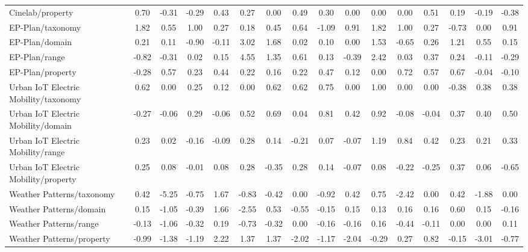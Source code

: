 \begin{tabular}{lccccccccccccccc}
Cinelab/property & 0.70 & -0.31 & -0.29 & 0.43 & 0.27 & 0.00 & 0.49 & 0.30 & 0.00 & 0.00 & 0.00 & 0.51 & 0.19 & -0.19 & -0.38 \\
EP-Plan/taxonomy & 1.82 & 0.55 & 1.00 & 0.27 & 0.18 & 0.45 & 0.64 & -1.09 & 0.91 & 1.82 & 1.00 & 0.27 & -0.73 & 0.00 & 0.91 \\
EP-Plan/domain & 0.21 & 0.11 & -0.90 & -0.11 & 3.02 & 1.68 & 0.02 & 0.10 & 0.00 & 1.53 & -0.65 & 0.26 & 1.21 & 0.55 & 0.15 \\
EP-Plan/range & -0.82 & -0.31 & 0.02 & 0.15 & 4.55 & 1.35 & 0.61 & 0.13 & -0.39 & 2.42 & 0.03 & 0.37 & 0.24 & -0.11 & -0.29 \\
EP-Plan/property & -0.28 & 0.57 & 0.23 & 0.44 & 0.22 & 0.16 & 0.22 & 0.47 & 0.12 & 0.00 & 0.72 & 0.57 & 0.67 & -0.04 & -0.10 \\
Urban IoT Electric Mobility/taxonomy & 0.62 & 0.00 & 0.25 & 0.12 & 0.00 & 0.62 & 0.62 & 0.75 & 0.00 & 1.00 & 0.00 & 0.00 & -0.38 & 0.38 & 0.38 \\
Urban IoT Electric Mobility/domain & -0.27 & -0.06 & 0.29 & -0.06 & 0.52 & 0.69 & 0.04 & 0.81 & 0.42 & 0.92 & -0.08 & -0.04 & 0.37 & 0.40 & 0.50 \\
Urban IoT Electric Mobility/range & 0.23 & 0.02 & -0.16 & -0.09 & 0.28 & 0.14 & -0.21 & 0.07 & -0.07 & 1.19 & 0.84 & 0.42 & 0.23 & 0.21 & 0.33 \\
Urban IoT Electric Mobility/property & 0.25 & 0.08 & -0.01 & 0.08 & 0.28 & -0.35 & 0.28 & 0.14 & -0.07 & 0.08 & -0.22 & -0.25 & 0.37 & 0.06 & -0.65 \\
Weather Patterns/taxonomy & 0.42 & -5.25 & -0.75 & 1.67 & -0.83 & -0.42 & 0.00 & -0.92 & 0.42 & 0.75 & -2.42 & 0.00 & 0.42 & -1.88 & 0.00 \\
Weather Patterns/domain & 0.15 & -1.05 & -0.39 & 1.66 & -2.55 & 0.53 & -0.55 & -0.15 & 0.15 & 0.13 & 0.16 & 0.16 & 0.60 & 0.15 & -0.16 \\
Weather Patterns/range & -0.13 & -1.06 & -0.32 & 0.19 & -0.73 & -0.32 & 0.00 & -0.16 & -0.16 & 0.16 & -0.44 & -0.11 & 0.00 & 0.00 & 0.11 \\
Weather Patterns/property & -0.99 & -1.38 & -1.19 & 2.22 & 1.37 & 1.37 & -2.02 & -1.17 & -2.04 & -0.29 & 0.27 & 0.82 & -0.15 & -3.01 & -0.77 \\
\bottomrule
\end{tabular}
